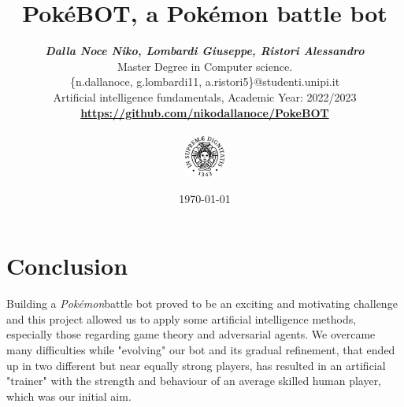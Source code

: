 \documentclass[10pt, a4paper, twocolumn]{article} %
\title{\vspace{-2cm}\textbf{PokéBOT, a Pokémon battle bot}}
\author{\textbf{\small{\textit{Dalla Noce Niko, Lombardi Giuseppe, Ristori Alessandro}}} \\ %
        \small{Master Degree in Computer science.}\\ \small{\{n.dallanoce, g.lombardi11, a.ristori5\}@studenti.unipi.it} \\  %
        \small{Artificial intelligence fundamentals, Academic Year: 2022/2023} \\
        \textbf{\small{\url{https://github.com/nikodallanoce/PokeBOT}}} \\ \\
        \includegraphics[width=0.10\textwidth]{unipi.png}
}
\date{\small{\today}} %
\begin{document}
\newcommand{\poke}{\textit{Pokémon}\space}

\maketitle %


\thispagestyle{firstpage} %
\raggedbottom






\section{Conclusion}\label{sec:conclusion}
Building a \poke battle bot proved to be an exciting and motivating challenge and this project allowed us to apply some artificial intelligence methods, especially those regarding game theory and adversarial agents. 
We overcame many difficulties while "evolving" our bot and its gradual refinement, that ended up in two different but near equally strong players, has resulted in an artificial "trainer" with the strength and behaviour of an average skilled human player, which was our initial aim.

\newpage
\onecolumn
{}



\newpage

\end{document}

